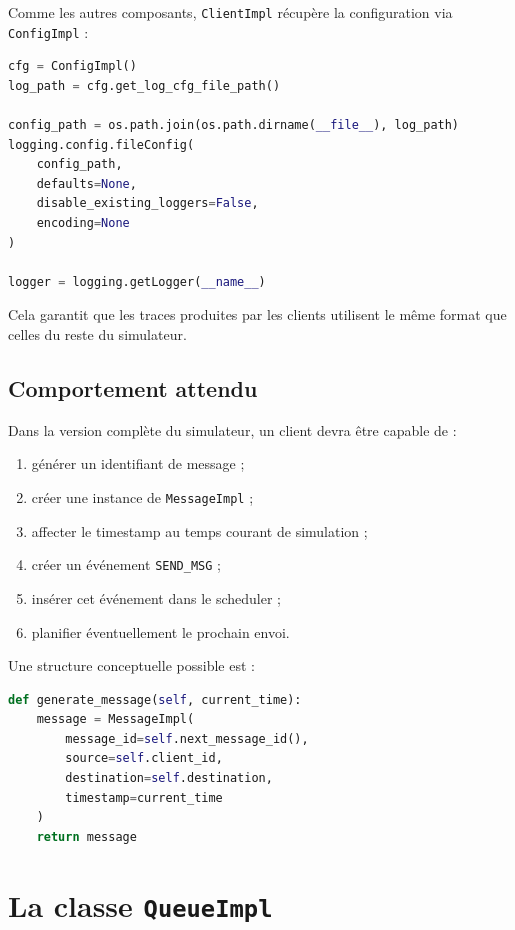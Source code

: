 \documentclass{article}
\begin{document}
Comme les autres composants, \texttt{ClientImpl} récupère la configuration via \texttt{ConfigImpl} :

\begin{lstlisting}[language=Python, caption=Configuration du logging dans ClientImpl.py]
cfg = ConfigImpl()
log_path = cfg.get_log_cfg_file_path()

config_path = os.path.join(os.path.dirname(__file__), log_path)
logging.config.fileConfig(
    config_path,
    defaults=None,
    disable_existing_loggers=False,
    encoding=None
)

logger = logging.getLogger(__name__)
\end{lstlisting}

Cela garantit que les traces produites par les clients utilisent le même format que celles du reste du simulateur.

\subsection{Comportement attendu}

Dans la version complète du simulateur, un client devra être capable de :
\begin{enumerate}[leftmargin=*]
    \item générer un identifiant de message ;
    \item créer une instance de \texttt{MessageImpl} ;
    \item affecter le timestamp au temps courant de simulation ;
    \item créer un événement \texttt{SEND\_MSG} ;
    \item insérer cet événement dans le scheduler ;
    \item planifier éventuellement le prochain envoi.
\end{enumerate}

Une structure conceptuelle possible est :

\begin{lstlisting}[language=Python, caption=Principe conceptuel de génération d'un message]
def generate_message(self, current_time):
    message = MessageImpl(
        message_id=self.next_message_id(),
        source=self.client_id,
        destination=self.destination,
        timestamp=current_time
    )
    return message
\end{lstlisting}

\section{La classe \texttt{QueueImpl}}
\end{document}
